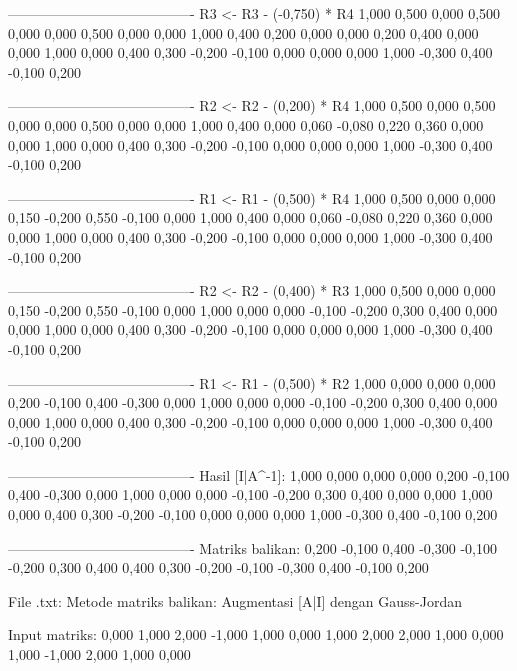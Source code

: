 \documentclass[12pt]{article}
\begin{document}
\begin{enumerate}
\begin{keluaran}
----------------------------------------
R3 <- R3 - (-0,750) * R4
1,000   0,500   0,000   0,500   0,000   0,000   0,500   0,000
0,000   1,000   0,400   0,200   0,000   0,000   0,200   0,400
0,000   0,000   1,000   0,000   0,400   0,300   -0,200  -0,100
0,000   0,000   0,000   1,000   -0,300  0,400   -0,100  0,200

----------------------------------------
R2 <- R2 - (0,200) * R4
1,000   0,500   0,000   0,500   0,000   0,000   0,500   0,000
0,000   1,000   0,400   0,000   0,060   -0,080  0,220   0,360
0,000   0,000   1,000   0,000   0,400   0,300   -0,200  -0,100
0,000   0,000   0,000   1,000   -0,300  0,400   -0,100  0,200

----------------------------------------
R1 <- R1 - (0,500) * R4
1,000   0,500   0,000   0,000   0,150   -0,200  0,550   -0,100
0,000   1,000   0,400   0,000   0,060   -0,080  0,220   0,360
0,000   0,000   1,000   0,000   0,400   0,300   -0,200  -0,100
0,000   0,000   0,000   1,000   -0,300  0,400   -0,100  0,200

----------------------------------------
R2 <- R2 - (0,400) * R3
1,000   0,500   0,000   0,000   0,150   -0,200  0,550   -0,100
0,000   1,000   0,000   0,000   -0,100  -0,200  0,300   0,400
0,000   0,000   1,000   0,000   0,400   0,300   -0,200  -0,100
0,000   0,000   0,000   1,000   -0,300  0,400   -0,100  0,200

----------------------------------------
R1 <- R1 - (0,500) * R2
1,000   0,000   0,000   0,000   0,200   -0,100  0,400   -0,300
0,000   1,000   0,000   0,000   -0,100  -0,200  0,300   0,400
0,000   0,000   1,000   0,000   0,400   0,300   -0,200  -0,100
0,000   0,000   0,000   1,000   -0,300  0,400   -0,100  0,200

----------------------------------------
Hasil [I|A^-1]:
1,000   0,000   0,000   0,000   0,200   -0,100  0,400   -0,300
0,000   1,000   0,000   0,000   -0,100  -0,200  0,300   0,400
0,000   0,000   1,000   0,000   0,400   0,300   -0,200  -0,100
0,000   0,000   0,000   1,000   -0,300  0,400   -0,100  0,200

----------------------------------------
Matriks balikan:
0,200   -0,100  0,400   -0,300
-0,100  -0,200  0,300   0,400
0,400   0,300   -0,200  -0,100
-0,300  0,400   -0,100  0,200

File .txt:
Metode matriks balikan: Augmentasi [A|I] dengan Gauss-Jordan

Input matriks:
0,000	1,000	2,000	-1,000
1,000	0,000	1,000	2,000
2,000	1,000	0,000	1,000
-1,000	2,000	1,000	0,000


\end{keluaran}
\end{enumerate}
\end{document}
